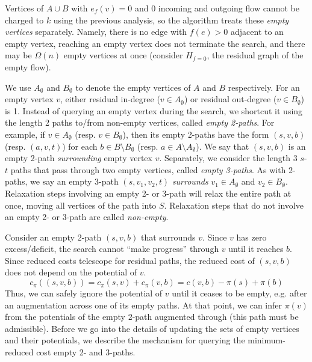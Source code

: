 \documentclass[11pt]{article}
\theoremstyle{plain}
\begin{document}
Vertices of $A \cup B$ with $e_f(v) = 0$ and 0 incoming and outgoing flow 
cannot be charged to $k$ using the previous analysis, so the algorithm treats 
these \emph{empty vertices} separately. %
Namely, there is no edge with $f(e) > 0$ adjacent to an empty vertex, 
reaching an empty vertex does not terminate the search, and there may be 
$\Omega(n)$ empty vertices at once (consider $H_{f = 0}$, the residual graph 
of the empty flow).

We use $A_\emptyset$ and $B_\emptyset$ to denote the empty vertices of $A$ and 
$B$ respectively.
For an empty vertex $v$, either residual in-degree ($v \in A_\emptyset$) or 
residual out-degree ($v \in B_\emptyset$) is 1. 
Instead of querying an empty vertex during the search, we shortcut it using the
length 2 paths to/from non-empty vertices, called \emph{empty 2-paths}.
For example, if $v \in A_\emptyset$ (resp. $v \in B_\emptyset$), then its empty 
2-paths have the form $(s, v, b)$ (resp. $(a, v, t)$) for each 
$b \in B \setminus B_\emptyset$ (resp. $a \in A \setminus A_\emptyset$).
We say that $(s, v, b)$ is an empty 2-path \emph{surrounding} empty vertex $v$.
Separately, we consider the length 3 $s$-$t$ paths that pass through two empty 
vertices, called \emph{empty 3-paths}.
As with 2-paths, we say an empty 3-path $(s, v_1, v_2, t)$ \emph{surrounds}
$v_1 \in A_\emptyset$ and $v_2 \in B_\emptyset$.
Relaxation steps involving an empty 2- or 3-path will relax the entire path
at once, moving all vertices of the path into $S$.
Relaxation steps that do not involve an empty 2- or 3-path are called 
\emph{non-empty}.

Consider an empty 2-path $(s, v, b)$ that surrounds $v$.
Since $v$ has zero excess/deficit, the search cannot ``make progress'' through 
$v$ until it reaches $b$.
Since reduced costs telescope for residual paths, the reduced cost of 
$(s, v, b)$ does not depend on the potential of $v$.
\begin{equation*}
	c_\pi((s, v, b)) = c_\pi(s, v) + c_\pi(v, b) = c(v, b) - \pi(s) + \pi(b)
\end{equation*}
Thus, we can safely ignore the potential of $v$ until it ceases to be 
empty, e.g. after an augmentation across one of its empty paths. 
At that point, we can infer $\pi(v)$ from the potentials of the empty 2-path 
augmented through (this path must be admissible).
Before we go into the details of updating the sets of empty vertices and their 
potentials, we describe the mechanism for querying the minimum-reduced cost 
empty 2- and 3-paths.
\end{document}
